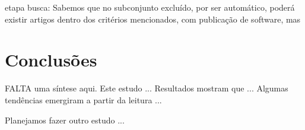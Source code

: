 etapa busca: Sabemos que no subconjunto excluído, por ser automático, poderá existir artigos
dentro dos critérios mencionados, com publicação de software, mas 

\section{Conclusões} \label{estudo1:conclusoes}

FALTA uma síntese aqui. 
Este estudo ...
Resultados mostram que ...
Algumas tendências emergiram a partir da leitura ...

Planejamos fazer outro estudo ... 







